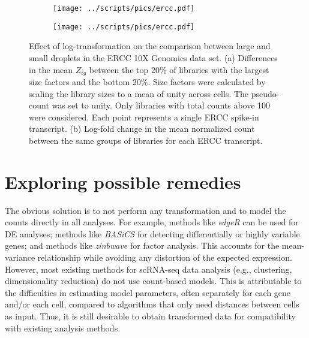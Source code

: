 \documentclass[10pt,letterpaper]{article}
\begin{document}
\begin{figure}
\centering
\begin{subfigure}[b]{0.49\textwidth}
    \texttt{[image: ../scripts/pics/ercc.pdf]}
    \caption{}
\end{subfigure}
\begin{subfigure}[b]{0.49\textwidth}
    \texttt{[image: ../scripts/pics/ercc.pdf]}
    \caption{}
\end{subfigure}
\caption{Effect of log-transformation on the comparison between large and small droplets in the ERCC 10X Genomics data set.
(a) Differences in the mean $Z_{ig}$ between the top 20\% of libraries with the largest size factors and the bottom 20\%.
Size factors were calculated by scaling the library sizes to a mean of unity across cells.
The pseudo-count was set to unity.
Only libraries with total counts above 100 were considered.
Each point represents a single ERCC spike-in transcript.
(b) Log-fold change in the mean normalized count between the same groups of libraries for each ERCC transcript.}
\label{fig:ercc}
\end{figure}

\section{Exploring possible remedies}
The obvious solution is to not perform any transformation and to model the counts directly in all analyses.
For example, methods like \textit{edgeR} \cite{robinson2010edgeR} can be used for DE analyses;
methods like \textit{BASiCS} \cite{vallejos2016beyond} for detecting differentially or highly variable genes;
and methods like \textit{zinbwave} \cite{risso2018general} for factor analysis.
This accounts for the mean-variance relationship while avoiding any distortion of the expected expression.
However, most existing methods for scRNA-seq data analysis (e.g., clustering, dimensionality reduction) do not use count-based models.
This is attributable to the difficulties in estimating model parameters, often separately for each gene and/or each cell,
compared to algorithms that only need distances between cells as input.
Thus, it is still desirable to obtain transformed data for compatibility with existing analysis methods.
\end{document}
